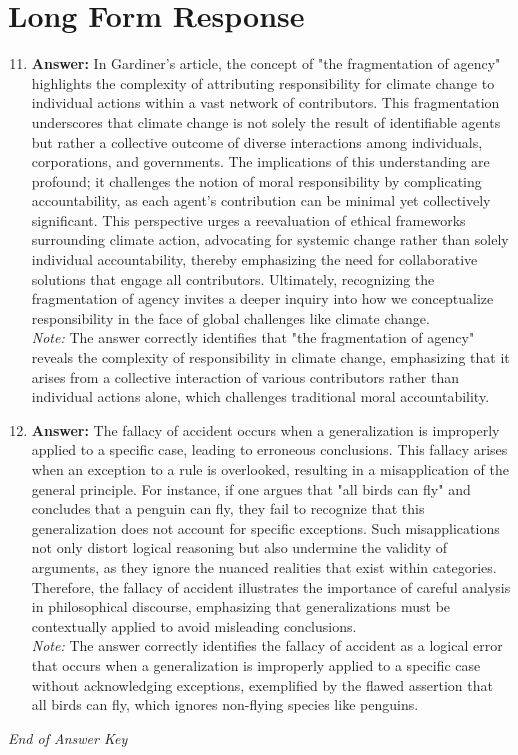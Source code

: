 \documentclass[12pt]{article}
\begin{document}
\section*{Long Form Response}
\begin{enumerate}[label=\arabic*.]
\setcounter{enumi}{10}
\item \textbf{Answer:} In Gardiner's article, the concept of "the fragmentation of agency" highlights the complexity of attributing responsibility for climate change to individual actions within a vast network of contributors. This fragmentation underscores that climate change is not solely the result of identifiable agents but rather a collective outcome of diverse interactions among individuals, corporations, and governments. The implications of this understanding are profound; it challenges the notion of moral responsibility by complicating accountability, as each agent's contribution can be minimal yet collectively significant. This perspective urges a reevaluation of ethical frameworks surrounding climate action, advocating for systemic change rather than solely individual accountability, thereby emphasizing the need for collaborative solutions that engage all contributors. Ultimately, recognizing the fragmentation of agency invites a deeper inquiry into how we conceptualize responsibility in the face of global challenges like climate change.
\\ \textit{Note:} The answer correctly identifies that "the fragmentation of agency" reveals the complexity of responsibility in climate change, emphasizing that it arises from a collective interaction of various contributors rather than individual actions alone, which challenges traditional moral accountability.
\item \textbf{Answer:} The fallacy of accident occurs when a generalization is improperly applied to a specific case, leading to erroneous conclusions. This fallacy arises when an exception to a rule is overlooked, resulting in a misapplication of the general principle. For instance, if one argues that "all birds can fly" and concludes that a penguin can fly, they fail to recognize that this generalization does not account for specific exceptions. Such misapplications not only distort logical reasoning but also undermine the validity of arguments, as they ignore the nuanced realities that exist within categories. Therefore, the fallacy of accident illustrates the importance of careful analysis in philosophical discourse, emphasizing that generalizations must be contextually applied to avoid misleading conclusions.
\\ \textit{Note:} The answer correctly identifies the fallacy of accident as a logical error that occurs when a generalization is improperly applied to a specific case without acknowledging exceptions, exemplified by the flawed assertion that all birds can fly, which ignores non-flying species like penguins.
\end{enumerate}

\vfill
\noindent\textit{End of Answer Key}
\end{document}
